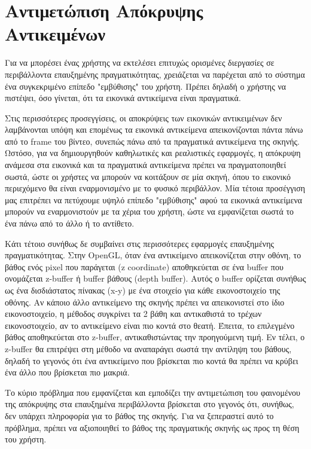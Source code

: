 \section{Αντιμετώπιση Απόκρυψης Αντικειμένων} \label{s:occlusion}



Για να μπορέσει ένας χρήστης να εκτελέσει επιτυχώς ορισμένες διεργασίες σε περιβάλλοντα επαυξημένης πραγματικότητας, χρειάζεται να παρέχεται από το σύστημα ένα συγκεκριμένο επίπεδο "εμβύθισης" του χρήστη. Πρέπει δηλαδή ο χρήστης να πιστέψει, όσο γίνεται, ότι τα εικονικά αντικείμενα είναι πραγματικά. 


Στις περισσότερες προσεγγίσεις, οι αποκρύψεις των εικονικών αντικειμένων δεν λαμβάνονται υπόψη και επομένως τα εικονικά αντικείμενα απεικονίζονται πάντα πάνω από το frame του βίντεο, συνεπώς πάνω από τα πραγματικά αντικείμενα της σκηνής. 
Ωστόσο, για να δημιουργηθούν καθηλωτικές και ρεαλιστικές εφαρμογές, η απόκρυψη ανάμεσα στα εικονικά και τα πραγματικά αντικείμενα πρέπει να πραγματοποιηθεί σωστά, ώστε οι χρήστες να μπορούν να κοιτάξουν σε μία σκηνή, όπου το εικονικό περιεχόμενο θα είναι εναρμονισμένο με το φυσικό περιβάλλον. Μία τέτοια προσέγγιση μας επιτρέπει να πετύχουμε υψηλό επίπεδο "εμβύθισης" αφού τα εικονικά αντικείμενα μπορούν να εναρμονιστούν με τα χέρια του χρήστη, ώστε να εμφανίζεται σωστά το ένα πάνω από το άλλο ή το αντίθετο. 

Κάτι τέτοιο συνήθως δε συμβαίνει στις περισσότερες εφαρμογές επαυξημένης πραγματικότητας. Στην OpenGL, όταν ένα αντικείμενο απεικονίζεται στην οθόνη, το βάθος ενός pixel που παράγεται (z coordinate) αποθηκεύεται σε ένα buffer που ονομάζεται z-buffer ή buffer βάθους (depth buffer). Αυτός ο buffer ορίζεται συνήθως ως ένα δισδιάστατος πίνακας (x-y) με ένα στοιχείο για κάθε εικονοστοιχείο της οθόνης. Αν κάποιο άλλο αντικείμενο της σκηνής πρέπει να απεικονιστεί στο ίδιο εικονοστοιχείο, η μέθοδος συγκρίνει τα 2 βάθη και αντικαθιστά το τρέχων εικονοστοιχείο, αν το αντικείμενο είναι πιο κοντά στο θεατή. Έπειτα, το επιλεγμένο βάθος αποθηκεύεται στο z-buffer, αντικαθιστώντας την προηγούμενη τιμή. Εν τέλει, ο z-buffer θα επιτρέψει στη μέθοδο να αναπαράγει σωστά την αντίληψη του βάθους, δηλαδή το γεγονός ότι ένα αντικείμενο που βρίσκεται πιο κοντά θα πρέπει να κρύβει ένα άλλο που βρίσκεται πιο μακριά.


Το κύριο πρόβλημα που εμφανίζεται και εμποδίζει την αντιμετώπιση του φαινομένου της απόκρυψης στα επαυξημένα περιβάλλοντα βρίσκεται στο γεγονός ότι, συνήθως, δεν υπάρχει πληροφορία για το βάθος της σκηνής. Για να ξεπεραστεί αυτό το πρόβλημα, πρέπει να αξιοποιηθεί το βάθος της πραγματικής σκηνής ως προς τη θέση του χρήστη. 

